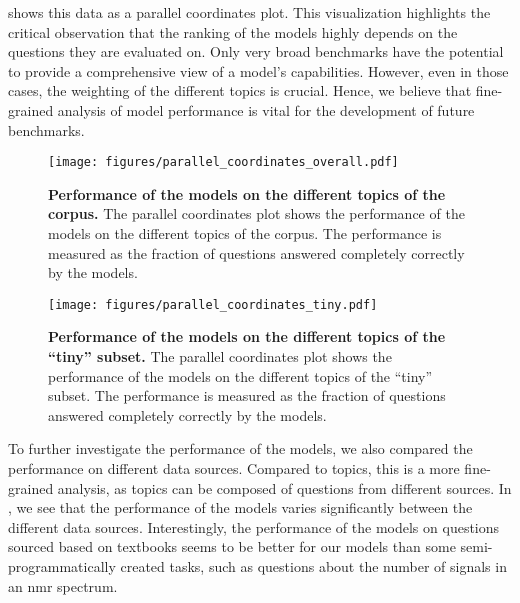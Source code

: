  shows this data as a parallel coordinates plot. 
This visualization highlights the critical observation that the ranking of the models highly depends on the questions they are evaluated on.
Only very broad benchmarks have the potential to provide a comprehensive view of a model's capabilities. However, even in those cases, the weighting of the different topics is crucial.
Hence, we believe that fine-grained analysis of model performance is vital for the development of future benchmarks.

\begin{figure}[htb]
    \centering
    \texttt{[image: figures/parallel\_coordinates\_overall.pdf]}
    \caption{\textbf{Performance of the models on the different topics of the \chembench corpus.} The parallel coordinates plot shows the performance of the models on the different topics of the \chembench corpus. The performance is measured as the fraction of questions answered completely correctly by the models. }
    \label{fig:parallel_coordinates_overall}
\end{figure}

\begin{figure}[htb]
    \centering
    \texttt{[image: figures/parallel\_coordinates\_tiny.pdf]}
    \caption{\textbf{Performance of the models on the different topics of the \enquote{tiny} subset.} The parallel coordinates plot shows the performance of the models on the different topics of the \enquote{tiny} subset. The performance is measured as the fraction of questions answered completely correctly by the models. }
    \label{fig:parallel_coordinates_tiny}
\end{figure}

To further investigate the performance of the models, we also compared the performance on different data sources.
Compared to topics, this is a more fine-grained analysis, as topics can be composed of questions from different sources.
In , we see that the performance of the models varies significantly between the different data sources.
Interestingly, the performance of the models on questions sourced based on textbooks seems to be better for our models than some semi-programmatically created tasks, such as questions about the number of signals in an \gls{nmr} spectrum.


